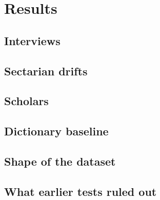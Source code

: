 \chapter{Results}
\label{ch:results}

\section{Interviews}
\label{sec:results_interviews}

\section{Sectarian drifts}
\label{sec:results_drifts}

\section{Scholars}
\label{sec:results_scholars}

\section{Dictionary baseline}
\label{sec:results_dictionary}

\section{Shape of the dataset}
\label{sec:results_shape}

\section{What earlier tests ruled out}
\label{sec:results_earlier_tests}
